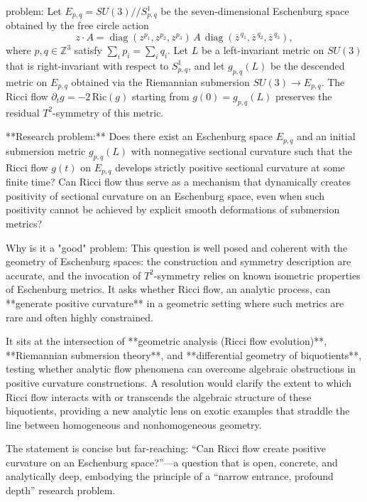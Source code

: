 problem:  
Let \( E_{p,q} = SU(3)//S^1_{p,q} \) be the seven-dimensional Eschenburg space obtained by the free circle action
\[
z \cdot A = \operatorname{diag}(z^{p_1},z^{p_2},z^{p_3})\,A\,\operatorname{diag}(\overline{z}^{\,q_1},\overline{z}^{\,q_2},\overline{z}^{\,q_3}),
\]
where \(p,q\in\mathbb{Z}^3\) satisfy \(\sum_i p_i=\sum_i q_i\).  
Let \(L\) be a left-invariant metric on \(SU(3)\) that is right-invariant with respect to \(S^1_{p,q}\), and let \(g_{p,q}(L)\) be the descended metric on \(E_{p,q}\) obtained via the Riemannian submersion \(SU(3)\rightarrow E_{p,q}\).  
The Ricci flow \(\partial_t g=-2\,\mathrm{Ric}(g)\) starting from \(g(0)=g_{p,q}(L)\) preserves the residual \(T^2\)-symmetry of this metric.

**Research problem:**  
Does there exist an Eschenburg space \(E_{p,q}\) and an initial submersion metric \(g_{p,q}(L)\) with nonnegative sectional curvature such that the Ricci flow \(g(t)\) on \(E_{p,q}\) develops strictly positive sectional curvature at some finite time?  
Can Ricci flow thus serve as a mechanism that dynamically creates positivity of sectional curvature on an Eschenburg space, even when such positivity cannot be achieved by explicit smooth deformations of submersion metrics?

Why is it a "good" problem:  
This question is well posed and coherent with the geometry of Eschenburg spaces: the construction and symmetry description are accurate, and the invocation of \(T^2\)-symmetry relies on known isometric properties of Eschenburg metrics. It asks whether Ricci flow, an analytic process, can **generate positive curvature** in a geometric setting where such metrics are rare and often highly constrained.  

It sits at the intersection of **geometric analysis (Ricci flow evolution)**, **Riemannian submersion theory**, and **differential geometry of biquotients**, testing whether analytic flow phenomena can overcome algebraic obstructions in positive curvature constructions. A resolution would clarify the extent to which Ricci flow interacts with or transcends the algebraic structure of these biquotients, providing a new analytic lens on exotic examples that straddle the line between homogeneous and nonhomogeneous geometry.  

The statement is concise but far-reaching: “Can Ricci flow create positive curvature on an Eschenburg space?”—a question that is open, concrete, and analytically deep, embodying the principle of a “narrow entrance, profound depth” research problem.